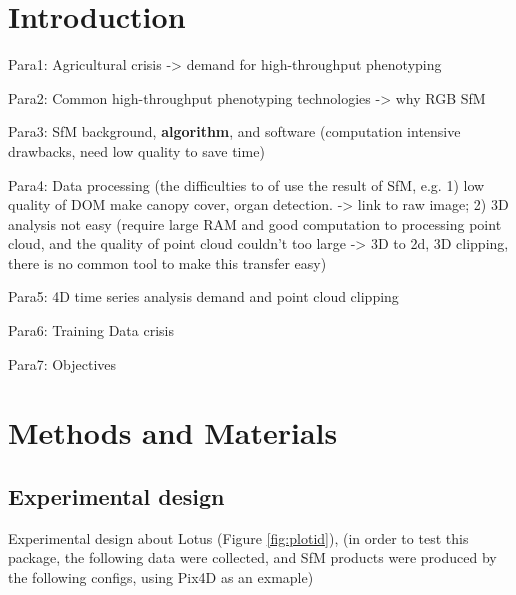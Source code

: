 \documentclass[sensors,article,submit,moreauthors, xelatex]{Definitions/mdpi}
\begin{document}
\section{Introduction}
Para1: Agricultural crisis -> demand for high-throughput phenotyping

Para2: Common high-throughput phenotyping technologies -> why RGB SfM

Para3: SfM background, \textbf{algorithm}, and software (computation intensive drawbacks, need low quality to save time)

Para4: Data processing (the difficulties to of use the result of SfM, e.g. 1) low quality of DOM make canopy cover, organ detection. -> link to raw image; 2) 3D analysis not easy (require large RAM and good computation to processing point cloud, and the quality of point cloud couldn't too large -> 3D to 2d, 3D clipping, there is no common tool to make this transfer easy)

Para5: 4D time series analysis demand and point cloud clipping

Para6: Training Data crisis

Para7: Objectives

\section{Methods and Materials}

\subsection{Experimental design}
Experimental design about Lotus (Figure  \ref{fig:plotid}), (in order to test this package, the following data were collected, and SfM products were produced by the following configs, using Pix4D as an exmaple)
\end{document}
